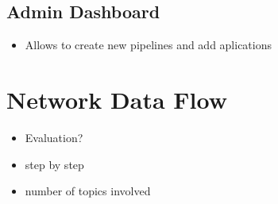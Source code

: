 \subsection{Admin Dashboard}
\begin{itemize}
    \item Allows to create new pipelines and add aplications
\end{itemize}

\section{Network Data Flow}
\begin{itemize}
    \item Evaluation?
    \item step by step
    \item number of topics involved
\end{itemize}
